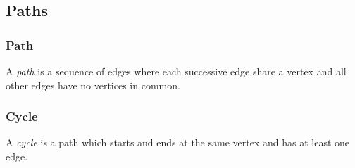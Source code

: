     \subsection{Paths}

      \subsubsection{Path}

        A \emph{path} is a sequence of edges where each successive edge share a vertex and all other edges have no vertices in common.

      \subsubsection{Cycle}

        A \emph{cycle} is a path which starts and ends at the same vertex and has at least one edge.
        
